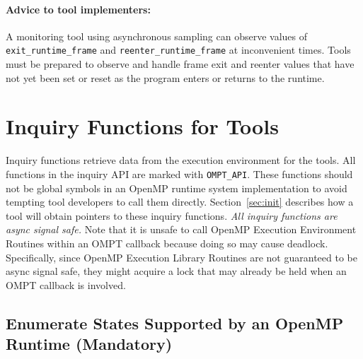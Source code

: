 \documentclass{article}
\begin{document}

\paragraph{Advice to tool implementers:} A monitoring tool using
      asynchronous sampling can observe values of 
      \verb|exit_runtime_frame| and \verb|reenter_runtime_frame| at inconvenient times. 
      Tools must be prepared to observe and handle frame exit and reenter values that have not yet been set or reset as the program enters or returns to the runtime. 


 
 

\section{Inquiry Functions for Tools}
\label{sec:inquiry}

 Inquiry functions retrieve data from the execution environment for
 the tools. 
 All functions in the inquiry API are marked with \verb|OMPT_API|. These functions should not be global symbols in an OpenMP runtime system implementation to avoid tempting tool developers to call them directly. Section~\ref{sec:init} describes how a tool will obtain pointers to these inquiry functions.
 {\em All inquiry functions are async signal safe.} 
 Note that it is unsafe to call OpenMP Execution Environment Routines within an OMPT callback because doing so may cause deadlock. 
 Specifically, since OpenMP Execution Library Routines are not guaranteed to be async signal safe, they might acquire a lock that may already be held when an OMPT callback is involved.
 
 \subsection{Enumerate States Supported by an OpenMP Runtime (Mandatory)}
 \label{ompt_enumerate_state}
 
\end{document}
